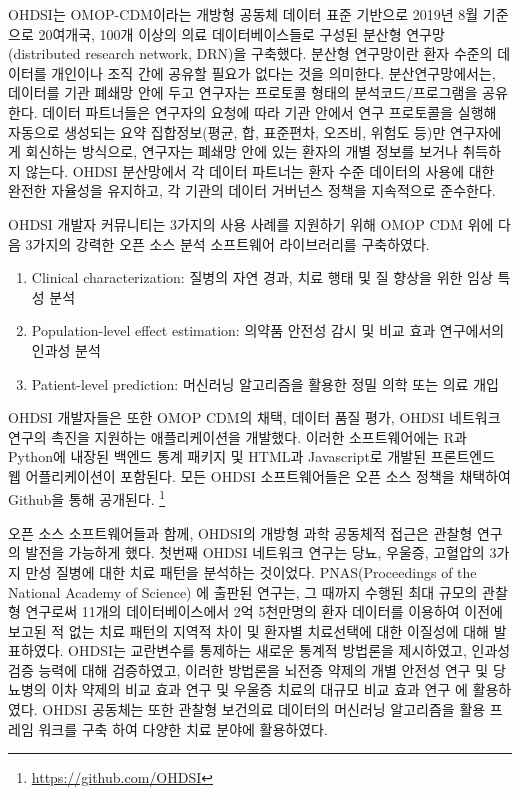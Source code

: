 \documentclass[11pt]{book}
\providecommand{\tightlist}{%
  \setlength{\itemsep}{0pt}\setlength{\parskip}{0pt}}
\let\rmarkdownfootnote\footnote%
\def\footnote{\protect\rmarkdownfootnote}
\theoremstyle{definition}
\theoremstyle{definition}
\theoremstyle{definition}
\theoremstyle{remark}
\begin{document}
OHDSI는 OMOP-CDM이라는 개방형 공동체 데이터 표준 기반으로 2019년 8월
기준으로 20여개국, 100개 이상의 의료 데이터베이스들로 구성된 분산형
연구망 (distributed research network, DRN)을 구축했다. 분산형 연구망이란
환자 수준의 데이터를 개인이나 조직 간에 공유할 필요가 없다는 것을
의미한다. 분산연구망에서는, 데이터를 기관 폐쇄망 안에 두고 연구자는
프로토콜 형태의 분석코드/프로그램을 공유한다. 데이터 파트너들은 연구자의
요청에 따라 기관 안에서 연구 프로토콜을 실행해 자동으로 생성되는 요약
집합정보(평균, 합, 표준편차, 오즈비, 위험도 등)만 연구자에게 회신하는
방식으로, 연구자는 폐쇄망 안에 있는 환자의 개별 정보를 보거나 취득하지
않는다. OHDSI 분산망에서 각 데이터 파트너는 환자 수준 데이터의 사용에
대한 완전한 자율성을 유지하고, 각 기관의 데이터 거버넌스 정책을
지속적으로 준수한다.

OHDSI 개발자 커뮤니티는 3가지의 사용 사례를 지원하기 위해 OMOP CDM 위에
다음 3가지의 강력한 오픈 소스 분석 소프트웨어 라이브러리를 구축하였다.

\begin{enumerate}
\def\labelenumi{\arabic{enumi})}
\tightlist
\item
  Clinical characterization: 질병의 자연 경과, 치료 행태 및 질 향상을
  위한 임상 특성 분석
\item
  Population-level effect estimation: 의약품 안전성 감시 및 비교 효과
  연구에서의 인과성 분석
\item
  Patient-level prediction: 머신러닝 알고리즘을 활용한 정밀 의학 또는
  의료 개입
\end{enumerate}

OHDSI 개발자들은 또한 OMOP CDM의 채택, 데이터 품질 평가, OHDSI 네트워크
연구의 촉진을 지원하는 애플리케이션을 개발했다. 이러한 소프트웨어에는
R과 Python에 내장된 백엔드 통계 패키지 및 HTML과 Javascript로 개발된
프론트엔드 웹 어플리케이션이 포함된다. 모든 OHDSI 소프트웨어들은 오픈
소스 정책을 채택하여 Github을 통해 공개된다. \footnote{\url{https://github.com/OHDSI}}

오픈 소스 소프트웨어들과 함께, OHDSI의 개방형 과학 공동체적 접근은
관찰형 연구의 발전을 가능하게 했다. 첫번째 OHDSI 네트워크 연구는 당뇨,
우울증, 고혈압의 3가지 만성 질병에 대한 치료 패턴을 분석하는 것이었다.
PNAS(Proceedings of the National Academy of Science) 에 출판된 연구는,
그 때까지 수행된 최대 규모의 관찰형 연구로써 11개의 데이터베이스에서 2억
5천만명의 환자 데이터를 이용하여 이전에 보고된 적 없는 치료 패턴의
지역적 차이 및 환자별 치료선택에 대한 이질성에 대해 발표하였다.
\citep{Hripcsak7329} OHDSI는 교란변수를 통제하는 새로운 통계적 방법론을
제시하였고, \citep{tian_2018} 인과성 검증 능력에 대해 검증하였고,
\citep{schuemie_2018} 이러한 방법론을 뇌전증 약제의 개별 안전성 연구
\citep{duke_2017} 및 당뇨병의 이차 약제의 비교 효과 연구
\citep{vashisht_2018} 및 우울증 치료의 대규모 비교 효과 연구
\citep{schuemie_2018b}에 활용하였다. OHDSI 공동체는 또한 관찰형 보건의료
데이터의 머신러닝 알고리즘을 활용 프레임 워크를 구축 \citep{reps2018}
하여 다양한 치료 분야에 활용하였다.
\citep{johnston_2019, cepeda_2018, reps_2019}
\end{document}
